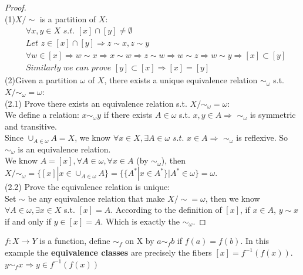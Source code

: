 \documentclass[11pt]{elegantbook}
\begin{document}
\begin{proof}
    \quad\\
    (1)$X/\sim$ is a partition of $X$:\\
    \begin{equation}
        \begin{aligned}
            &\forall x,y\in X \textit{ s.t. }[x]\cap[y]\neq \emptyset\\
            &\textit{Let } z\in[x]\cap[y]\Rightarrow z\sim x, z\sim y\\
            &\forall w\in[x]\Rightarrow w\sim x\Rightarrow x\sim w\Rightarrow z\sim w\Rightarrow w\sim z\Rightarrow w\sim y\Rightarrow [x]\subset [y]\\
            &\textit{Similarly we can prove } [y]\subset [x]\Rightarrow [x]=[y]
        \end{aligned}
        \nonumber
    \end{equation}
    (2)Given a partition $\omega$ of $X$, there exists a unique equivalence relation $\sim_\omega$ s.t. $X/\sim_\omega=\omega$:\\
    (2.1) Prove there exists an equivalence relation s.t. $X/\sim_\omega=\omega$:\\
    We define a relation: $x\sim_\omega y$ if there exists $A\in \omega$ s.t. $x,y\in A\Rightarrow$ $\sim_\omega$ is symmetric and transitive.\\
    Since $\cup_{A\in\omega}A=X$, we know $\forall x\in X, \exists A\in \omega \textit{ s.t. } x\in A\Rightarrow$ $\sim_\omega$ is reflexive. So $\sim_\omega$ is an equivalence relation.\\
    We know $A=[x], \forall A\in\omega, \forall x\in A$ (by $\sim_\omega$),
    then $X/\sim_\omega= \{[x]|x\in \cup_{A\in\omega}A \}=\{\{A^*|x\in A^*\}|A^*\in\omega \}=\omega$.\\
    (2.2) Prove the equivalence relation is unique:\\
    Set $\sim$ be any equivalence relation that make $X/\sim=\omega$, then we know $\forall A\in \omega, \exists x\in X$ s.t. $[x]=A$. According to the definition of $[x]$, if $x\in A$, $y\sim x$ if and only if $y\in[x]=A$. Which is exactly the $\sim_\omega$.
\end{proof}
\begin{example}
    $f:X \rightarrow Y$ is a function, define $\sim_f$ on X by $a\sim_f b$ if $f(a)=f(b)$. In this example the \textbf{equivalence classes} are precisely the fibers $[x]=f^{-1}(f(x))$. $y\sim_f x\Rightarrow y\in f^{-1}(f(x))$
\end{example}
\end{document}
